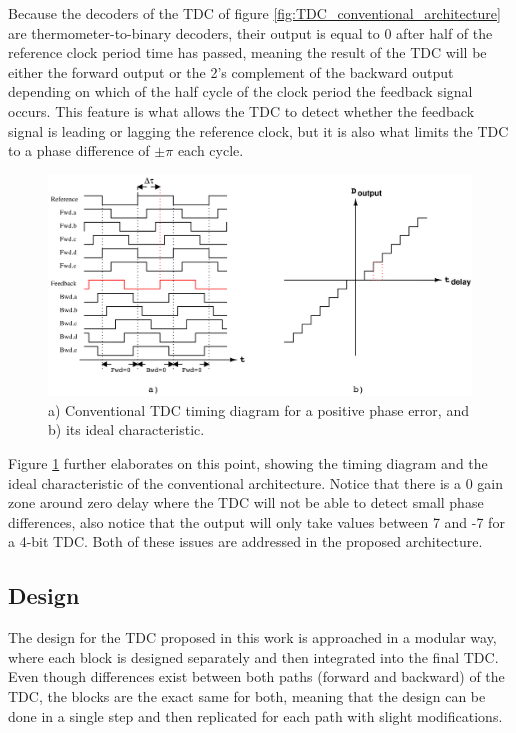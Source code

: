 Because the decoders of the TDC of figure \ref{fig:TDC_conventional_architecture} are thermometer-to-binary decoders, their output is equal to 0 after half of the reference clock period time has
passed, meaning the result of the TDC will be either the forward output or the 2's complement of the backward output depending on which of the half cycle of the clock period the feedback signal
occurs. This feature is what allows the TDC to detect whether the feedback signal is leading or lagging the reference clock, but it is also what limits the TDC to a phase difference of $\pm \pi$
each cycle.

\begin{figure}[H]
    \centering
    \includegraphics[width=1\textwidth]{figures/TDC_timing_diagram.png}
    \caption{a) Conventional TDC timing diagram for a positive phase error, and b) its ideal characteristic.}
    \label{fig:TDC_conventional_timing_diagram}
\end{figure}

Figure \ref{fig:TDC_conventional_timing_diagram} further elaborates on this point, showing the timing diagram and the ideal characteristic of the conventional architecture. Notice that there 
is a 0 gain zone around zero delay where the TDC will not be able to detect small phase differences, also notice that the output will only take values between 7 and -7 for a 4-bit TDC. Both of
these issues are addressed in the proposed architecture.

\subsection{Design}
The design for the TDC proposed in this work is approached in a modular way, where each block is designed separately and then integrated into the final TDC. Even though differences exist between
both paths (forward and backward) of the TDC, the blocks are the exact same for both, meaning that the design can be done in a single step and then replicated for each path with
slight modifications.


